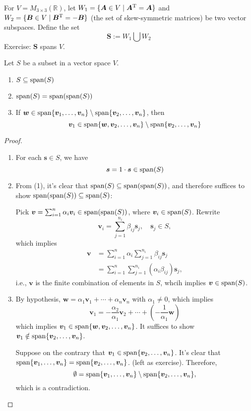 \begin{example}
For $V=M_{3\times 3}(\mathbb{R})$, let $W_1=\{\bm A\in V\mid \bm A^{\mathrm T}=\bm A\}$ and $W_2=\{\bm B\in V\mid\bm B^{\mathrm T}=-\bm B\}$ (the set of skew-symmetric matrices) be two vector subspaces. Define the set
\[
\bm S:= W_1\bigcup W_2
\]
Exercise: $\bm S$ spans $V$.
\end{example}
\begin{proposition}\label{Pro:1:7}
Let $S$ be a subset in a vector space $V$.
\begin{enumerate}
\item
$S\subseteq\operatorname{span}(S)$
\item
$\operatorname{span}(S)=\operatorname{span}(\operatorname{span}(S))$
\item
If $\bm w\in\operatorname{span}\{\bm v_1,\dots,\bm v_n\}\setminus\operatorname{span}\{\bm v_2,\dots,\bm v_n\}$, then 
\[
\bm v_1\in\operatorname{span}\{\bm w,\bm v_2,\dots,\bm v_n\}\setminus
\operatorname{span}\{\bm v_2,\dots,\bm v_n\}
\]
\end{enumerate}
\end{proposition}
\begin{proof}
\begin{enumerate}
\item
For each $\bm s\in S$, we have 
\[
\bm s=1\cdot\bm s\in\operatorname{span}(S)
\]
\item
From (1), it's clear that $\operatorname{span}(S)\subseteq\operatorname{span}(\operatorname{span}(S))$, and therefore suffices to show $\operatorname{span}(\operatorname{span}(S))\subseteq\operatorname{span}(S)$:

Pick $\bm v=\sum_{i=1}^n\alpha_i\bm v_i\in \operatorname{span}(\operatorname{span}(S))$, where $\bm v_i\in\operatorname{span}(S)$. Rewrite 
\[
\bm v_i=\sum_{j=1}^{n_i}\beta_{ij}\bm s_j,\quad \bm s_j\in S,
\]
which implies
\begin{align*}
\bm v&=\sum_{i=1}^n\alpha_i\sum_{j=1}^{n_i}\beta_{ij}\bm s_j\\
&=\sum_{i=1}^n\sum_{j=1}^{n_i}(\alpha_i\beta_{ij})\bm s_j,
\end{align*}
i.e., $\bm v$ is the finite combination of elements in $S$, whcih implies $\bm v\in\operatorname{span}(S)$.
\item
By hypothesis, $\bm w=\alpha_1\bm v_1+\cdots+\alpha_n\bm v_n$ with $\alpha_1\ne0$, which implies
\[
\bm v_1=-\frac{\alpha_2}{\alpha_1}\bm v_2+\cdots+\left(
-\frac{1}{\alpha_1}\bm w
\right)
\]
which implies $\bm v_1\in\operatorname{span}\{\bm w,\bm v_2,\dots,\bm v_n\}$. It suffices to show $\bm v_1\notin\operatorname{span}\{\bm v_2,\dots,\bm v_n\}$.

Suppose on the contrary that $\bm v_1\in \operatorname{span}\{\bm v_2,\dots,\bm v_n\}$. It's clear that $\operatorname{span}\{\bm v_1,\dots,\bm v_n\}=\operatorname{span}\{\bm v_2,\dots,\bm v_n\}$. (left as exercise). Therefore,
\[
\emptyset=\operatorname{span}\{\bm v_1,\dots,\bm v_n\}\setminus\operatorname{span}\{\bm v_2,\dots,\bm v_n\},
\]
which is a contradiction.
\end{enumerate}
\end{proof}


